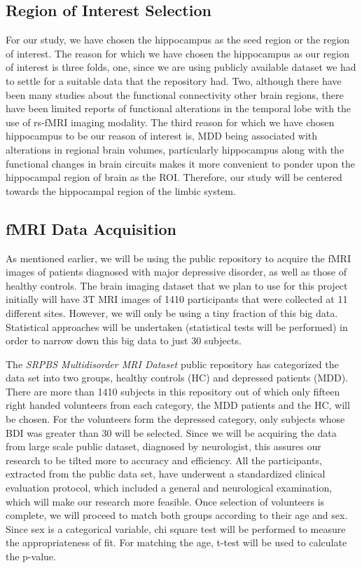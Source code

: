﻿\documentclass[12pt]{article}
\begin{document}
\subsection{Region of Interest Selection}

For our study, we have chosen the hippocampus as the seed region or
the region of interest. The reason for which we have chosen the
hippocampus as our region of interest is three folds, one, since we
are using publicly available dataset we had to settle for a suitable
data that the repository had. Two, although there have been many
studies about the functional connectivity other brain regions, there
have been limited reports of functional alterations in the temporal
lobe with the use of rs-fMRI imaging modality. The third reason for
which we have chosen hippocampus to be our reason of interest is, MDD
being associated with alterations in regional brain volumes,
particularly hippocampus along with the functional changes in brain
circuits makes it more convenient to ponder upon the hippocampal
region of brain as the ROI. Therefore, our study will be centered
towards the hippocampal region of the limbic system.

\subsection{fMRI Data Acquisition}

As mentioned earlier, we will be using the \textcite{dataset} public
repository to acquire the fMRI images of patients diagnosed with major
depressive disorder, as well as those of healthy controls. The brain
imaging dataset that we plan to use for this project initially will
have 3T MRI images of 1410 participants that were collected at 11
different sites. However, we will only be using a tiny fraction of
this big data. Statistical approaches will be undertaken (statistical
tests will be performed) in order to narrow down this big data to just
30 subjects.

\enlargethispage{\baselineskip} The \textit{SRPBS Multidisorder MRI
Dataset} public repository has categorized the data set into two
groups, healthy controls (HC) and depressed patients (MDD). There are
more than 1410 subjects in this repository out of which only fifteen
right handed volunteers from each category, the MDD patients and the
HC, will be chosen. For the volunteers form the depressed category,
only subjects whose BDI was greater than 30 will be selected. Since we
will be acquiring the data from large scale public dataset, diagnosed
by neurologist, this assures our research to be tilted more to
accuracy and efficiency. All the participants, extracted from the
public data set, have underwent a standardized clinical evaluation
protocol, which included a general and neurological examination, which
will make our research more feasible. Once selection of volunteers is
complete, we will proceed to match both groups according to their age
and sex. Since sex is a categorical variable, chi square test will be
performed to measure the appropriateness of fit. For matching the age,
t-test will be used to calculate the p-value.
\end{document}
